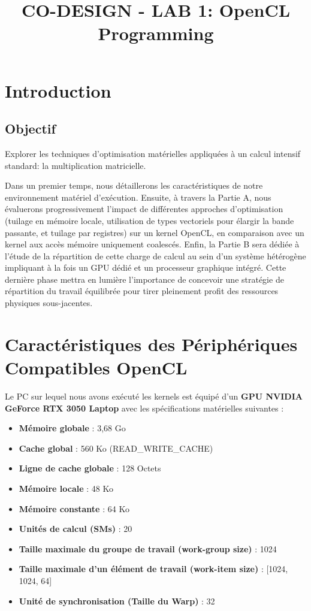 \documentclass[12pt, a4paper]{article}
\title{CO-DESIGN - LAB 1: OpenCL Programming}
\date{}
\begin{document}
\maketitle

\section{Introduction}

\subsection{Objectif}
Explorer les techniques d'optimisation matérielles appliquées à un calcul intensif standard: la multiplication matricielle.

Dans un premier temps, nous détaillerons les caractéristiques de notre environnement matériel d'exécution. Ensuite, à travers la Partie A, nous évaluerons progressivement l'impact de différentes approches d'optimisation (tuilage en mémoire locale, utilisation de types vectoriels pour élargir la bande passante, et tuilage par registres) sur un kernel OpenCL, en comparaison avec un kernel aux accès mémoire uniquement coalescés. Enfin, la Partie B sera dédiée à l'étude de la répartition de cette charge de calcul au sein d'un système hétérogène impliquant à la fois un GPU dédié et un processeur graphique intégré. Cette dernière phase mettra en lumière l'importance de concevoir une stratégie de répartition du travail équilibrée pour tirer pleinement profit des ressources physiques sous-jacentes.

\section{Caractéristiques des Périphériques Compatibles OpenCL}
Le PC sur lequel nous avons exécuté les kernels est équipé d'un \textbf{GPU NVIDIA GeForce RTX 3050 Laptop} avec les spécifications matérielles suivantes :
\begin{itemize}
    \item \textbf{Mémoire globale} : 3,68 Go
    \item \textbf{Cache global} : 560 Ko (READ\_WRITE\_CACHE)
    \item \textbf{Ligne de cache globale} : 128 Octets
    \item \textbf{Mémoire locale} : 48 Ko
    \item \textbf{Mémoire constante} : 64 Ko
    \item \textbf{Unités de calcul (SMs)} : 20
    \item \textbf{Taille maximale du groupe de travail (work-group size)} : 1024
    \item \textbf{Taille maximale d'un élément de travail (work-item size)} : [1024, 1024, 64]
    \item \textbf{Unité de synchronisation (Taille du Warp)} : 32
\end{itemize}
\end{document}
